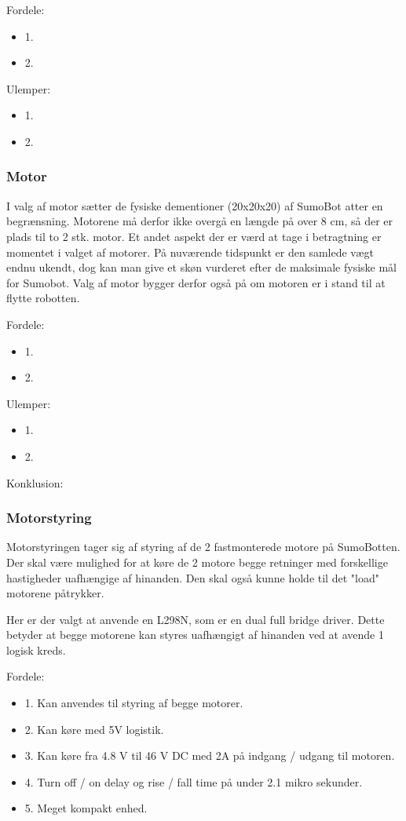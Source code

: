 Fordele: 
\begin{itemize}
\item 1.
\item 2.
\end{itemize}

Ulemper: 
\begin{itemize}
\item 1.
\item 2.
\end{itemize}


\subsubsection*{\textbf{Motor}}
I valg af motor sætter de fysiske dementioner (20x20x20) af SumoBot atter en begrænsning. Motorene må derfor ikke overgå en længde på over 8 cm, så der er plads til to 2 stk. motor. Et andet aspekt der er værd at tage i betragtning er momentet i valget af motorer. På nuværende tidspunkt er den samlede vægt endnu ukendt, dog kan man give et skøn vurderet efter de maksimale fysiske mål for Sumobot. Valg af motor bygger derfor også på om motoren er i stand til at flytte robotten. \tbd


Fordele:\tbr 
\begin{itemize}
\item 1.
\item 2.
\end{itemize}

Ulemper: \tbr
\begin{itemize}
\item 1.
\item 2.
\end{itemize}

Konklusion:
\tbr
\subsubsection*{\textbf{Motorstyring}}
Motorstyringen tager sig af styring af de 2 fastmonterede motore på SumoBotten. Der skal være mulighed for at køre de 2 motore begge retninger med forskellige hastigheder uafhængige af hinanden. Den skal også kunne holde til det "load" motorene påtrykker.

Her er der valgt at anvende en L298N, som er en dual full bridge driver\cite{L298Data}. Dette betyder at begge motorene kan styres uafhængigt af hinanden ved at avende 1 logisk kreds.\tbr

Fordele: 
\begin{itemize}
\item 1. Kan anvendes til styring af begge motorer.
\item 2. Kan køre med 5V logistik.
\item 3. Kan køre fra 4.8 V til 46 V DC med 2A på indgang / udgang til motoren.
\item 4. Turn off / on delay og rise / fall time på under 2.1 mikro sekunder.
\item 5.  Meget kompakt enhed. 
\end{itemize}

